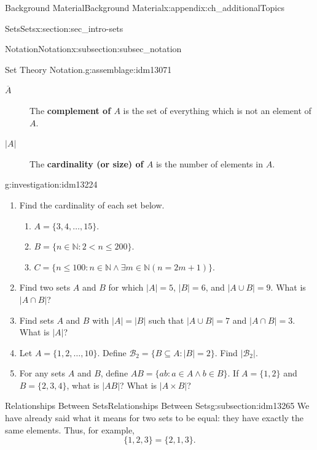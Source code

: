 \documentclass[oneside,10pt,]{book}
\newcommand{\terminology}[1]{\textbf{#1}}
\numberwithin{equation}{chapter}
\def\N{\mathbb N}
\def\st{:}
\newcommand{\card}[1]{\left| #1 \right|}
\newcommand{\lt}{<}
\begin{document}
\begin{appendixptx}{Background Material}{}{Background Material}{}{}{x:appendix:ch_additionalTopics}
\begin{sectionptx}{Sets}{}{Sets}{}{}{x:section:sec_intro-sets}
\begin{subsectionptx}{Notation}{}{Notation}{}{}{x:subsection:subsec_notation}
\begin{assemblage}{Set Theory Notation.}{g:assemblage:idm13071}
\begin{description}
\item[{\(\overline{A}\)}]The \terminology{complement of \(A\)} is the set of everything which is not an element of \(A\). \label{g:notation:idm13207}%
\item[{\(\card{A}\)}]The \terminology{cardinality (or size) of \(A\)} is the number of elements in \(A\).\label{g:notation:idm13218} %
\end{description}
%
\end{assemblage}
\begin{investigation}{}{g:investigation:idm13224}%
%
\begin{enumerate}
\item{}Find the cardinality of each set below.%
\begin{enumerate}
\item{}\(A = \{3,4,\ldots, 15\}\).%
\item{}\(B = \{n \in \N \st 2 \lt  n \le 200\}\).%
\item{}\(C = \{n \le 100 \st n \in \N \wedge \exists m \in \N (n = 2m+1)\}\).%
\end{enumerate}
%
\item{}Find two sets \(A\) and \(B\) for which \(|A| = 5\), \(|B| = 6\), and \(|A\cup B| = 9\). What is \(|A \cap B|\)?%
\item{}Find sets \(A\) and \(B\) with \(|A| = |B|\) such that \(|A\cup B| = 7\) and \(|A \cap B| = 3\). What is \(|A|\)?%
\item{}Let \(A = \{1,2,\ldots, 10\}\). Define \(\mathcal{B}_2 = \{B \subseteq A \st |B| = 2\}\). Find \(|\mathcal{B}_2|\).%
\item{}For any sets \(A\) and \(B\), define \(AB = \{ab \st a\in A \wedge b \in B\}\). If \(A = \{1,2\}\) and \(B = \{2,3,4\}\), what is \(|AB|\)? What is \(|A \times B|\)?%
\end{enumerate}
%
\end{investigation}
\end{subsectionptx}
%
%
\typeout{************************************************}
\typeout{************************************************}
%
\begin{subsectionptx}{Relationships Between Sets}{}{Relationships Between Sets}{}{}{g:subsection:idm13265}
We have already said what it means for two sets to be equal: they have exactly the same elements. Thus, for example,%
\begin{equation*}
\{1, 2, 3\} = \{2, 1, 3\}.
\end{equation*}

\end{subsectionptx}
\end{sectionptx}
\end{appendixptx}
\end{document}
